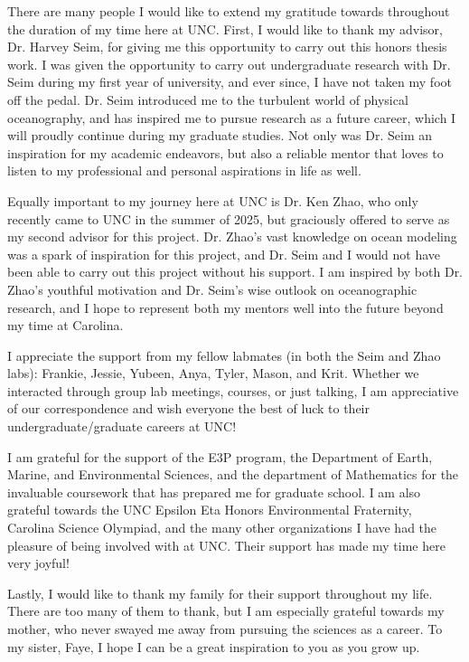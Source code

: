 


There are many people I would like to extend my gratitude towards throughout the duration of my time here at UNC. First, I would like to thank my advisor, Dr. Harvey Seim, for giving me this opportunity to carry out this honors thesis work. I was given the opportunity to carry out undergraduate research with Dr. Seim during my first year of university, and ever since, I have not taken my foot off the pedal. Dr. Seim introduced me to the turbulent world of physical oceanography, and has inspired me to pursue research as a future career, which I will proudly continue during my graduate studies. Not only was Dr. Seim an inspiration for my academic endeavors, but also a reliable mentor that loves to listen to my professional and personal aspirations in life as well. 

Equally important to my journey here at UNC is Dr. Ken Zhao, who only recently came to UNC in the summer of 2025, but graciously offered to serve as my second advisor for this project. Dr. Zhao's vast knowledge on ocean modeling was a spark of inspiration for this project, and Dr. Seim and I would not have been able to carry out this project without his support. I am inspired by both Dr. Zhao's youthful motivation and Dr. Seim's wise outlook on oceanographic research, and I hope to represent both my mentors well into the future beyond my time at Carolina. 

I appreciate the support from my fellow labmates (in both the Seim and Zhao labs): Frankie, Jessie, Yubeen, Anya, Tyler, Mason, and Krit. Whether we interacted through group lab meetings, courses, or just talking, I am appreciative of our correspondence and wish everyone the best of luck to their undergraduate/graduate careers at UNC!

I am grateful for the support of the E3P program, the Department of Earth, Marine, and Environmental Sciences, and the department of Mathematics for the invaluable coursework that has prepared me for graduate school. I am also grateful towards the UNC Epsilon Eta Honors Environmental Fraternity, Carolina Science Olympiad, and the many other organizations I have had the pleasure of being involved with at UNC. Their support has made my time here very joyful!

Lastly, I would like to thank my family for their support throughout my life. There are too many of them to thank, but I am especially grateful towards my mother, who never swayed me away from pursuing the sciences as a career. To my sister, Faye, I hope I can be a great inspiration to you as you grow up. 


